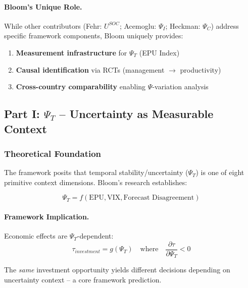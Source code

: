 \paragraph{Bloom's Unique Role.}
While other contributors (Fehr: $U^{SOC}$; Acemoglu: $\Psi_I$; Heckman: $\Psi_C$) 
address specific framework components, Bloom uniquely provides:
\begin{enumerate}
    \item \textbf{Measurement infrastructure} for $\Psi_T$ (EPU Index)
    \item \textbf{Causal identification} via RCTs (management $\to$ productivity)
    \item \textbf{Cross-country comparability} enabling $\Psi$-variation analysis
\end{enumerate}

\subsection{Part I: $\Psi_T$ – Uncertainty as Measurable Context}

\subsubsection{Theoretical Foundation}

The framework posits that temporal stability/uncertainty ($\Psi_T$) is one of 
eight primitive context dimensions. Bloom's research establishes:

\begin{equation}
\boxed{
\Psi_T = f(\text{EPU}, \text{VIX}, \text{Forecast Disagreement})
}
\label{eq:bloom-psi-t}
\end{equation}

\paragraph{Framework Implication.}
Economic effects are $\Psi_T$-dependent:
\begin{equation}
\tau_{investment} = g(\Psi_T) \quad \text{where} \quad \frac{\partial \tau}{\partial \Psi_T} < 0
\end{equation}

The \textit{same} investment opportunity yields different decisions depending on 
uncertainty context – a core framework prediction.

